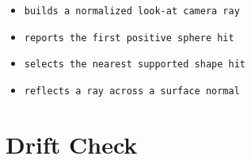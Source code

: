 \begin{itemize}
\tightlist
\item
  \texttt{b\allowbreak{}u\allowbreak{}i\allowbreak{}l\allowbreak{}d\allowbreak{}s\allowbreak{} \allowbreak{}a\allowbreak{} \allowbreak{}n\allowbreak{}o\allowbreak{}r\allowbreak{}m\allowbreak{}a\allowbreak{}l\allowbreak{}i\allowbreak{}z\allowbreak{}e\allowbreak{}d\allowbreak{} \allowbreak{}l\allowbreak{}o\allowbreak{}o\allowbreak{}k\allowbreak{}-\allowbreak{}a\allowbreak{}t\allowbreak{} \allowbreak{}c\allowbreak{}a\allowbreak{}m\allowbreak{}e\allowbreak{}r\allowbreak{}a\allowbreak{} \allowbreak{}r\allowbreak{}a\allowbreak{}y}
\item
  \texttt{r\allowbreak{}e\allowbreak{}p\allowbreak{}o\allowbreak{}r\allowbreak{}t\allowbreak{}s\allowbreak{} \allowbreak{}t\allowbreak{}h\allowbreak{}e\allowbreak{} \allowbreak{}f\allowbreak{}i\allowbreak{}r\allowbreak{}s\allowbreak{}t\allowbreak{} \allowbreak{}p\allowbreak{}o\allowbreak{}s\allowbreak{}i\allowbreak{}t\allowbreak{}i\allowbreak{}v\allowbreak{}e\allowbreak{} \allowbreak{}s\allowbreak{}p\allowbreak{}h\allowbreak{}e\allowbreak{}r\allowbreak{}e\allowbreak{} \allowbreak{}h\allowbreak{}i\allowbreak{}t}
\item
  \texttt{s\allowbreak{}e\allowbreak{}l\allowbreak{}e\allowbreak{}c\allowbreak{}t\allowbreak{}s\allowbreak{} \allowbreak{}t\allowbreak{}h\allowbreak{}e\allowbreak{} \allowbreak{}n\allowbreak{}e\allowbreak{}a\allowbreak{}r\allowbreak{}e\allowbreak{}s\allowbreak{}t\allowbreak{} \allowbreak{}s\allowbreak{}u\allowbreak{}p\allowbreak{}p\allowbreak{}o\allowbreak{}r\allowbreak{}t\allowbreak{}e\allowbreak{}d\allowbreak{} \allowbreak{}s\allowbreak{}h\allowbreak{}a\allowbreak{}p\allowbreak{}e\allowbreak{} \allowbreak{}h\allowbreak{}i\allowbreak{}t}
\item
  \texttt{r\allowbreak{}e\allowbreak{}f\allowbreak{}l\allowbreak{}e\allowbreak{}c\allowbreak{}t\allowbreak{}s\allowbreak{} \allowbreak{}a\allowbreak{} \allowbreak{}r\allowbreak{}a\allowbreak{}y\allowbreak{} \allowbreak{}a\allowbreak{}c\allowbreak{}r\allowbreak{}o\allowbreak{}s\allowbreak{}s\allowbreak{} \allowbreak{}a\allowbreak{} \allowbreak{}s\allowbreak{}u\allowbreak{}r\allowbreak{}f\allowbreak{}a\allowbreak{}c\allowbreak{}e\allowbreak{} \allowbreak{}n\allowbreak{}o\allowbreak{}r\allowbreak{}m\allowbreak{}a\allowbreak{}l}
\end{itemize}

\section{Drift Check}\label{record-159-drift-check}

